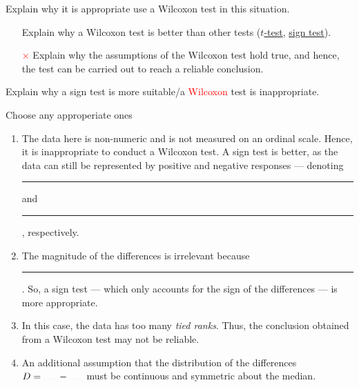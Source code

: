 \begin{note}
  Explain why it is appropriate use a Wilcoxon test in this situation.
  \begin{enumerate}
    \item[\textcolor{green!70!black}{\checkmark}] Explain why a Wilcoxon test is better than other tests (\hyperlink{wilcoxon>t}{\(t\)-test}, \hyperlink{wilcoxson>sign}{sign test}).
    \item[\textcolor{red}{\(\times\)}] Explain why the assumptions of the Wilcoxon test hold true, and hence, the test can be carried out to reach a reliable conclusion. 
  \end{enumerate}
\end{note}
\begin{note}
  Explain why a sign test is more suitable/a \textcolor{red}{Wilcoxon} test is inappropriate.
  \begin{center}
    \parbox{0.9\textwidth}{
      Choose any approperiate ones
      \begin{enumerate}
        \item The data here is non-numeric and is not measured on an ordinal scale. Hence, it is inappropriate to conduct a Wilcoxon test. A sign test is better, as the data can still be represented by positive and negative responses --- denoting \rule{1cm}{0.01mm} and \rule{1cm}{0.01mm}, respectively.
        \item The magnitude of the differences is irrelevant because \rule{1cm}{0.01mm}. So, a sign test --- which only accounts for the sign of the differences --- is more appropriate.
        \item In this case, the data has too many \emph{tied ranks}. Thus, the conclusion obtained from a Wilcoxon test may not be reliable.
        \item An additional assumption that the distribution of the differences \(D=\rule{0.5cm}{0.01mm}-\rule{0.5cm}{0.01mm}\) must be continuous and symmetric about the median. 
      \end{enumerate}
    }
  \end{center}
\end{note}
